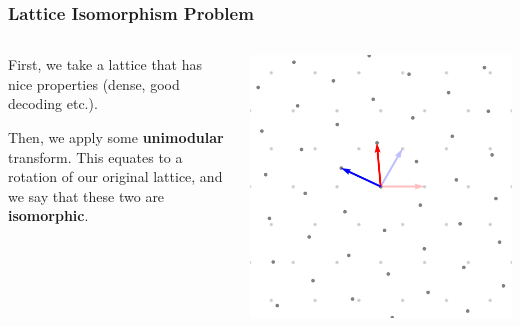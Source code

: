 \documentclass[
aspectratio=169, %
t, %
onlytextwidth, %
10pt, %
]{beamer}
\begin{document}
\begin{frame}
    \frametitle{Lattice Isomorphism Problem}
    \begin{columns}[T]
        \begin{column}{0.48\linewidth}
            First, we take a lattice that has nice properties (dense, good decoding etc.).

            Then, we apply some \textbf{unimodular} transform. This equates to a rotation of our original lattice, and we say that these two are \textbf{isomorphic}.

        \end{column}
        \begin{column}{0.48\linewidth}
            \includegraphics[width=\linewidth]{a2_rotated_basis.png}
        \end{column}
    \end{columns}
\end{frame}

\end{document}
